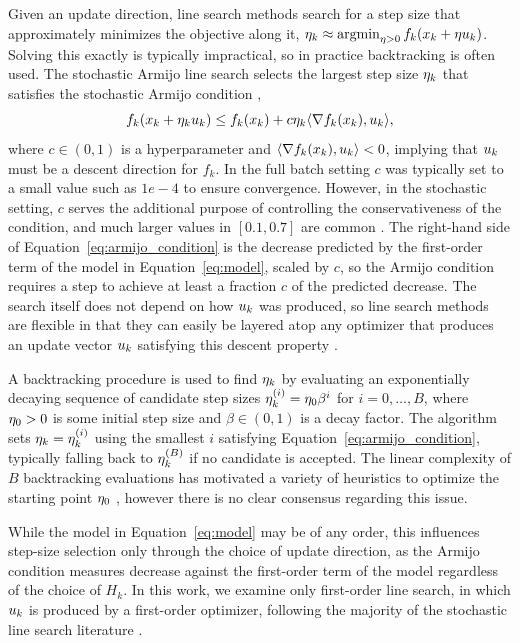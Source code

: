Given an update direction, line search methods search for a step size that approximately minimizes the objective along it, $\eta_{k} \approx \operatorname{argmin}_{\eta > 0} f_k(x_{k} + \eta u_{k})$. Solving this exactly is typically impractical, so in practice backtracking is often used. The stochastic Armijo line search selects the largest step size $\eta_{k}$ that satisfies the stochastic Armijo condition \cite{vaswani2019painless},
\begin{equation}
        f_k(x_{k} + \eta_{k} u_{k}) \le f_k(x_{k}) + c \eta_{k} \langle \nabla f_k(x_{k}), u_{k} \rangle,
    \label{eq:armijo_condition}
\end{equation}
where $c \in (0, 1)$ is a hyperparameter and $\langle \nabla f_k(x_{k}), u_{k} \rangle < 0$, implying that $u_{k}$ must be a descent direction for $f_k$. In the full batch setting $c$ was typically set to a small value such as $1e-4$ to ensure convergence. However, in the stochastic setting, $c$ serves the additional purpose of controlling the conservativeness of the condition, and much larger values in $[0.1, 0.7]$ are common . The right-hand side of Equation~\eqref{eq:armijo_condition} is the decrease predicted by the first-order term of the model in Equation~\eqref{eq:model}, scaled by $c$, so the Armijo condition requires a step to achieve at least a fraction $c$ of the predicted decrease. The search itself does not depend on how $u_{k}$ was produced, so line search methods are flexible in that they can easily be layered atop any optimizer that produces an update vector $u_{k}$ satisfying this descent property \cite{nocedal2006numerical,vaswani2025armijo,shea2024so}.

A backtracking procedure is used to find $\eta_{k}$ by evaluating an exponentially decaying sequence of candidate step sizes $\eta_{k}^{(i)} = \eta_0 \beta^i$ for $i = 0, \dots, B$, where $\eta_0 > 0$ is some initial step size and $\beta \in (0, 1)$ is a decay factor. The algorithm sets $\eta_{k} = \eta_{k}^{(i)}$ using the smallest $i$ satisfying Equation~\eqref{eq:armijo_condition}, typically falling back to $\eta_{k}^{(B)}$ if no candidate is accepted. The linear complexity of $B$ backtracking evaluations has motivated a variety of heuristics to optimize the starting point $\eta_0$ \cite{vaswani2019painless}, however there is no clear consensus regarding this issue.

While the model in Equation~\eqref{eq:model} may be of any order, this influences step-size selection only through the choice of update direction, as the Armijo condition measures decrease against the first-order term of the model regardless of the choice of $H_k$. In this work, we examine only first-order line search, in which $u_{k}$ is produced by a first-order optimizer, following the majority of the stochastic line search literature \cite{vaswani2019painless,galli2023monotone,vaswani2025armijo,shea2024so,fox2024glocal}.

